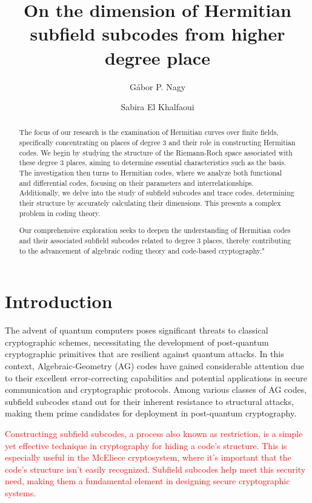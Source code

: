 \documentclass[a4paper]{amsart}
\title{On the dimension of Hermitian subfield subcodes from higher degree place}
\author{G\'{a}bor P. Nagy}
\author{Sabira El Khalfaoui}
\date{}
\makeatletter
\theoremstyle{plain}
\theoremstyle{definition}
\theoremstyle{remark}
\providecommand{\keywords}[1]{%
	\def\@keywords{\textbf{Keywords---} #1}
}
\makeatother
\begin{document}
\maketitle


\begin{abstract}
The focus of our research is the examination of Hermitian curves over finite fields, specifically concentrating on places of degree 3 and their role in constructing Hermitian codes. We begin by studying the structure of the Riemann-Roch space associated with these degree 3 places, aiming to determine essential characteristics such as the basis. The investigation then turns to Hermitian codes, where we analyze both functional and differential codes, focusing on their parameters and interrelationships. Additionally, we delve into the study of subfield subcodes and trace codes, determining their structure by accurately calculating their dimensions. This presents a complex problem in coding theory.

Our comprehensive exploration seeks to deepen the understanding of Hermitian codes and their associated subfield subcodes related to degree 3 places, thereby contributing to the advancement of algebraic coding theory and code-based cryptography."
\end{abstract}

\keywords{Hermitian curves, Degree 3 places, Riemann-Roch space, Hermitian codes, Subfield subcodes}




\section{Introduction}

The advent of quantum computers poses significant threats to classical cryptographic schemes, necessitating the development of post-quantum cryptographic primitives that are resilient against quantum attacks. In this context, Algebraic-Geometry (AG) codes have gained considerable attention due to their excellent error-correcting capabilities and potential applications in secure communication and cryptographic protocols. Among various classes of AG codes, subfield subcodes stand out for their inherent resistance to structural attacks, making them prime candidates for deployment in post-quantum cryptography.


\textcolor{red}{Constructingg subfield subcodes, a process also known as restriction, is a simple yet effective technique in cryptography for hiding a code's structure. This is especially useful in the McEliece cryptosystem, where it's important that the code's structure isn't easily recognized. Subfield subcodes help meet this security need, making them a fundamental element in designing secure cryptographic systems.}
\end{document}
